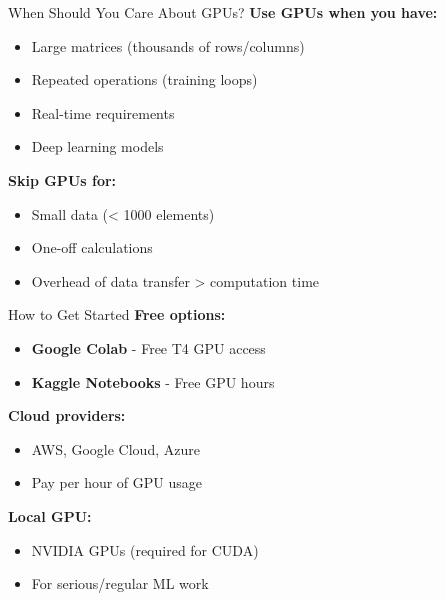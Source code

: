 \documentclass[10pt]{beamer}
\begin{document}
\begin{frame}{When Should You Care About GPUs?}
  \textbf{Use GPUs when you have:}
  
  \vspace{1em}
  \begin{itemize}
    \item Large matrices (thousands of rows/columns)
    \item Repeated operations (training loops)
    \item Real-time requirements
    \item Deep learning models
  \end{itemize}
  
  \vspace{1em}
  \textbf{Skip GPUs for:}
  \begin{itemize}
    \item Small data (< 1000 elements)
    \item One-off calculations
    \item Overhead of data transfer > computation time
  \end{itemize}
\end{frame}

\begin{frame}{How to Get Started}
  \textbf{Free options:}
  \begin{itemize}
    \item \textbf{Google Colab} - Free T4 GPU access
    \item \textbf{Kaggle Notebooks} - Free GPU hours
  \end{itemize}
  
  \vspace{1em}
  \textbf{Cloud providers:}
  \begin{itemize}
    \item AWS, Google Cloud, Azure
    \item Pay per hour of GPU usage
  \end{itemize}
  
  \vspace{1em}
  \textbf{Local GPU:}
  \begin{itemize}
    \item NVIDIA GPUs (required for CUDA)
    \item For serious/regular ML work
  \end{itemize}
\end{frame}
\end{document}
